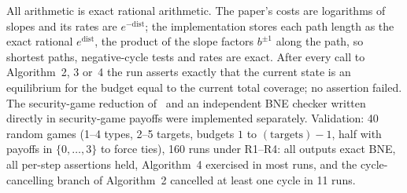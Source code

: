 All arithmetic is exact rational arithmetic. The paper's costs are logarithms of slopes and its rates
are $e^{-\mathrm{dist}}$; the implementation stores each path length as the exact rational
$e^{\mathrm{dist}}$, the product of the slope factors $b^{\pm1}$ along the path, so shortest paths,
negative-cycle tests and rates are exact. After every call to Algorithm~2, 3 or~4 the run asserts exactly
that the current state is an equilibrium for the budget equal to the current total coverage; no assertion
failed. The security-game reduction of~\cite[Section~3.1]{lck16} and an independent BNE checker written
directly in security-game payoffs were implemented separately. Validation: 40 random games (1--4 types,
2--5 targets, budgets $1$ to $(\text{targets})-1$, half with payoffs in $\{0,\dots,3\}$ to force ties),
160 runs under R1--R4: all outputs exact BNE, all per-step assertions held, Algorithm~4 exercised in most
runs, and the cycle-cancelling branch of Algorithm~2 cancelled at least one cycle in 11 runs.

